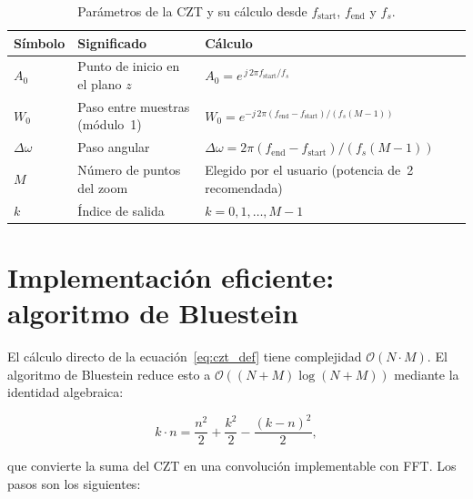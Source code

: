 \documentclass[12pt, a4paper, twoside]{report}
\begin{document}
\begin{table}[H]
  \centering
  \caption{Parámetros de la CZT y su cálculo desde $f_\text{start}$,
  $f_\text{end}$ y $f_s$.}
  \label{tab:czt_params}
  \begin{tabular}{p{1.5cm}p{4.5cm}p{6cm}}
    \toprule
    \textbf{Símbolo} & \textbf{Significado} & \textbf{Cálculo} \\
    \midrule
    $A_0$ & Punto de inicio en el plano $z$
    & $A_0 = e^{\,j\,2\pi f_\text{start}/f_s}$ \\[4pt]
    $W_0$ & Paso entre muestras (módulo~1)
    & $W_0 = e^{-j\,2\pi(f_\text{end}-f_\text{start})/(f_s(M-1))}$ \\[4pt]
    $\Delta\omega$ & Paso angular
    & $\Delta\omega = 2\pi(f_\text{end}-f_\text{start})/(f_s(M-1))$ \\[4pt]
    $M$   & Número de puntos del zoom
    & Elegido por el usuario (potencia de~2 recomendada) \\[4pt]
    $k$   & Índice de salida
    & $k = 0, 1, \ldots, M-1$ \\
    \bottomrule
  \end{tabular}
\end{table}

\section{Implementación eficiente: algoritmo de Bluestein}
\label{sec:bluestein}

El cálculo directo de la ecuación~\eqref{eq:czt_def} tiene complejidad
$\mathcal{O}(N\cdot M)$. El algoritmo de Bluestein reduce esto a
$\mathcal{O}((N+M)\log(N+M))$ mediante la identidad algebraica:

\begin{equation}
  k\cdot n = \frac{n^2}{2} + \frac{k^2}{2} - \frac{(k-n)^2}{2},
\end{equation}

que convierte la suma del CZT en una convolución implementable con FFT.
Los pasos son los siguientes:
\end{document}
